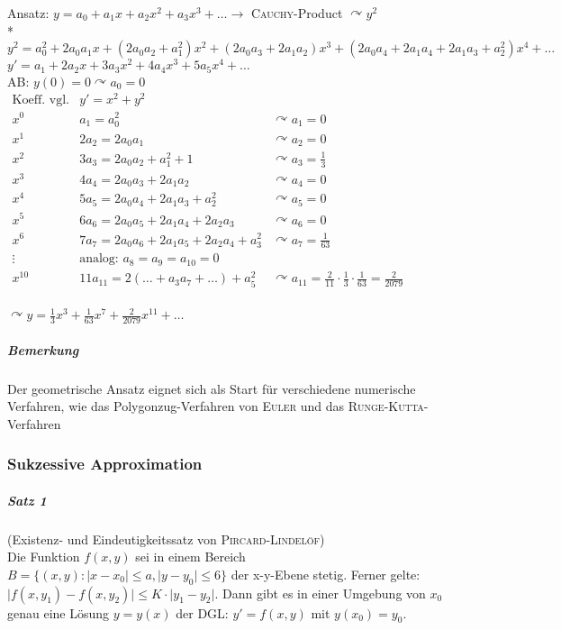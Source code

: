 \documentclass[a4paper]{scrartcl}
\begin{document}
Ansatz: $y= a_0 + a_1 x + a_2 x^2 + a_3 x^3 + \dots \rightarrow$ \textsc{Cauchy}-Product $\curvearrowright y^2$\\*
$y^2= a_0^2 + 2a_0 a_1 x + (2a_0 a_2 + a_1^2)x^2 + (2a_0a_3+2a_1 a_2) x^3 + (2a_0 a_4+ 2a_1 a_4 + 2a_1 a_3 + a_2^2)x^4 + \dots$\\
$y' = a_1 + 2a_2 x + 3a_3 x^2 + 4a_4 x^3 + 5 a_5 x^4 + \dots$\\
AB: $y(0) = 0 \curvearrowright a_0 = 0$\\
$\begin{array}{c|lr}
\text{Koeff. vgl.} & y' = x^2 + y^2 & \\ \hline
x^0 & a_1 = a_0^2 & \curvearrowright a_1 = 0 \\
x^1 & 2a_2 = 2a_0 a_1 & \curvearrowright a_2 = 0\\
x^2 & 3a_3 = 2a_0a_2 + a_1^2 + 1 & \curvearrowright a_3 = \frac{1}{3}\\
x^3 & 4a_4 = 2a_0a_3 + 2a_1a_2 & \curvearrowright a_4 = 0\\
x^4 & 5a_5 = 2a_0a_4 + 2a_1a_3 + a_2^2 & \curvearrowright a_5 = 0 \\
x^5 & 6a_6 = 2a_0a_5 + 2a_1a_4 + 2a_2 a_3 & \curvearrowright a_6 = 0\\
x^6 & 7a_7 = 2a_0a_6 + 2a_1a_5 + 2a_2a_4 + a_3^2 & \curvearrowright a_7 = \frac{1}{63}\\
\vdots & \text{analog: } a_8=a_9=a_10 = 0 & \\
x^{10} & 11 a_{11} = 2(\dots + a_3a_7 + \dots ) + a_5^2 & \curvearrowright a_{11} = \frac{2}{11} \cdot \frac{1}{3} \cdot \frac{1}{63} = \frac{2}{2079}\\
\end{array}$

$\curvearrowright y = \frac{1}{3} x^3 + \frac{1}{63} x^7 + \frac{2}{2079} x^{11} + \dots$

\subparagraph{Bemerkung} Der geometrische Ansatz eignet sich als Start für verschiedene numerische Verfahren, wie das Polygonzug-Verfahren von \textsc{Euler} und das \textsc{Runge-Kutta}-Verfahren

\subsubsection{Sukzessive  Approximation}
\subparagraph{Satz 1} (Existenz- und Eindeutigkeitssatz von \textsc{Pircard-Lindelöf})\\
Die Funktion $f(x,y)$ sei in einem Bereich $B=\{(x,y) : \lvert x - x_0 \rvert \leq a, \lvert y -y_0 \rvert \leq 6 \}$ der x-y-Ebene stetig. Ferner gelte: $\lvert f(x,y_1) - f(x,y_2) \rvert \leq K \cdot \lvert y_1 - y_2 \rvert$. Dann gibt es in einer Umgebung von $x_0$ genau eine Lösung $y= y(x)$ der DGL: $y'= f(x,y)$ mit $y(x_0) = y_0$.
\end{document}
